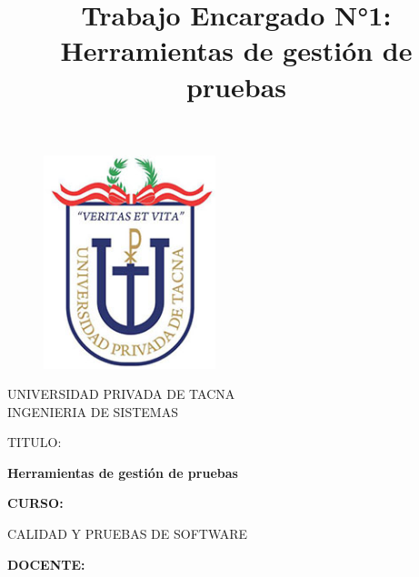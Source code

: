\documentclass[twoside,twocolumn]{article}
\begin{document}
\title{Trabajo Encargado N°1: Herramientas de gestión de pruebas}

\begin{titlepage}
\begin{figure}[htb]
\begin{center}
\includegraphics[width=5cm]{imagenes/logo.png}
\end{center}
\end{figure}
\vspace*{-0.25in}
\begin{center}
\large{UNIVERSIDAD PRIVADA DE TACNA}\\
\vspace*{-0.025in}
INGENIERIA DE SISTEMAS  \\

\vspace*{0.5in}
\begin{large}
TITULO:\\
\end{large}

\vspace*{0.1in}
\begin{Large}
\textbf{Herramientas de gestión de pruebas} \\
\end{Large}

\vspace*{0.3in}
\begin{Large}
\textbf{CURSO:} \\
\end{Large}

\vspace*{0.1in}
\begin{large}
CALIDAD Y PRUEBAS DE SOFTWARE\\
\end{large}

\vspace*{0.3in}
\begin{Large}
\textbf{DOCENTE:} \\
\end{Large}


\end{center}
\end{titlepage}
\end{document}
